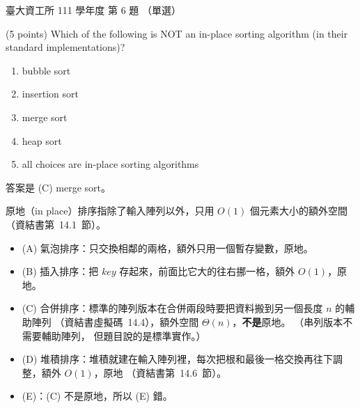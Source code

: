 \begin{pastexam}[label={px:ntu-111-dsaa-06}]{臺大資工所 111 學年度 第 6 題}
（單選）

(5 points) Which of the following is NOT an in-place sorting algorithm (in their standard
implementations)?
\begin{enumerate}[label=(\Alph*)]
\item bubble sort
\item insertion sort
\item merge sort
\item heap sort
\item all choices are in-place sorting algorithms
\end{enumerate}
\end{pastexam}

\begin{pastsoln}
答案是 (C) merge sort。

原地（in place）排序指除了輸入陣列以外，只用 $O(1)$ 個元素大小的額外空間（資結書第~14.1~節）。
\begin{itemize}
\item (A) 氣泡排序：只交換相鄰的兩格，額外只用一個暫存變數，原地。
\item (B) 插入排序：把 $\mathit{key}$ 存起來，前面比它大的往右挪一格，額外 $O(1)$，原地。
\item (C) 合併排序：標準的陣列版本在合併兩段時要把資料搬到另一個長度 $n$ 的輔助陣列
（資結書虛擬碼~14.4），額外空間 $\Theta(n)$，\textbf{不是}原地。 （串列版本不需要輔助陣列，
但題目說的是標準實作。）
\item (D) 堆積排序：堆積就建在輸入陣列裡，每次把根和最後一格交換再往下調整，額外 $O(1)$，原地
（資結書第~14.6~節）。
\item (E)：(C) 不是原地，所以 (E) 錯。
\end{itemize}
\end{pastsoln}
